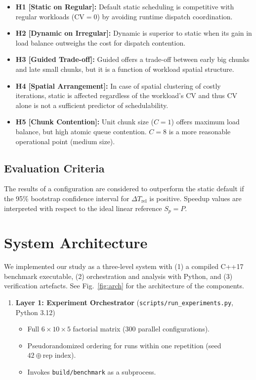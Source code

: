 \documentclass[conference]{IEEEtran}
\begin{document}
\begin{itemize}
    \item \textbf{H1 [Static on Regular]:} Default static scheduling is competitive with regular workloads (\(\mathrm{CV}=0\)) by avoiding runtime dispatch coordination.

    \item \textbf{H2 [Dynamic on Irregular]:} Dynamic is superior to static when its gain in load balance outweighs the cost for dispatch contention.

    \item \textbf{H3 [Guided Trade-off]:} Guided offers a trade-off between early big chunks and late small chunks, but it is a function of workload spatial structure.

    \item \textbf{H4 [Spatial Arrangement]:} In case of spatial clustering of costly iterations, static is affected regardless of the workload's CV and thus CV alone is not a sufficient predictor of schedulability.

    \item \textbf{H5 [Chunk Contention]:} Unit chunk size (\(C=1\)) offers maximum load balance, but high atomic queue contention. \(C=8\) is a more reasonable operational point (medium size).
\end{itemize}

\subsection{Evaluation Criteria}

The results of a configuration are considered to outperform the static default if the 95\% bootstrap confidence interval for \(\Delta T_{\text{rel}}\) is positive. Speedup values are interpreted with respect to the ideal linear reference \(S_p=P\).

\section{System Architecture}

We implemented our study as a three-level system with (1) a compiled C++17 benchmark executable, (2) orchestration and analysis with Python, and (3) verification artefacts. See Fig.~\ref{fig:arch} for the architecture of the components.

\begin{enumerate}
    \item \textbf{Layer 1: Experiment Orchestrator} (\texttt{scripts/run\_experiments.py}, Python 3.12)
    \begin{itemize}
        \item Full \(6 \times 10 \times 5\) factorial matrix (300 parallel configurations).
        \item Pseudorandomized ordering for runs within one repetition (seed \(42 \oplus \text{rep index}\)).
        \item Invokes \texttt{build/benchmark} as a subprocess.
    \end{itemize}
\end{enumerate}
\end{document}
